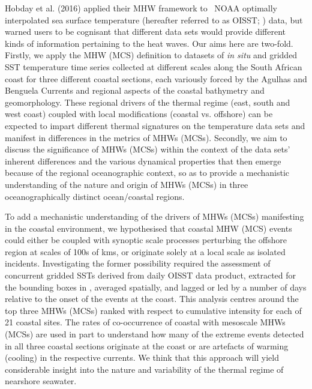 \documentclass[a4paper,10pt,review]{elsarticle}
\begin{document}
Hobday et al. (2016) \cite{Hobday2016} applied their MHW framework to \degree~NOAA optimally interpolated sea surface temperature (hereafter referred to as OISST; \cite{Reynolds2007}) data, but warned users to be cognisant that different data sets would provide different kinds of information pertaining to the heat waves. Our aims here are two-fold. Firstly, we apply the MHW (MCS) definition to datasets of \emph{in situ} and gridded SST temperature time series collected at different scales along the South African coast for three different coastal sections, each variously forced by the Agulhas and Benguela Currents and regional aspects of the coastal bathymetry and geomorphology. These regional drivers of the thermal regime (east, south and west coast) coupled with local modifications (coastal vs. offshore) can be expected to impart different thermal signatures on the temperature data sets and manifest in differences in the metrics of MHWs (MCSs). Secondly, we aim to discuss the significance of MHWs (MCSs) within the context of the data sets’ inherent differences and the various dynamical properties that then emerge because of the regional oceanographic context, so as to provide a mechanistic understanding of the nature and origin of MHWs (MCSs) in three oceanographically distinct ocean/coastal regions.

To add a mechanistic understanding of the drivers of MHWs (MCSs) manifesting in the coastal environment, we hypothesised that coastal MHW (MCS) events could either be coupled with synoptic scale processes perturbing the offshore region at scales of 100s of kms, or originate solely at a local scale as isolated incidents. Investigating the former possibility required the assessment of concurrent gridded SSTs derived from daily OISST data product, extracted for the bounding boxes in , averaged spatially, and lagged or led by a number of days relative to the onset of the events at the coast. This analysis centres around the top three MHWs (MCSs) ranked with respect to cumulative intensity for each of 21 coastal sites. The rates of co-occurrence of coastal with mesoscale MHWs (MCSs) are used in part to understand how many of the extreme events detected in all three coastal sections originate at the coast or are artefacts of warming (cooling) in the respective currents. We think that this approach will yield considerable insight into the nature and variability of the thermal regime of nearshore seawater.
\end{document}
